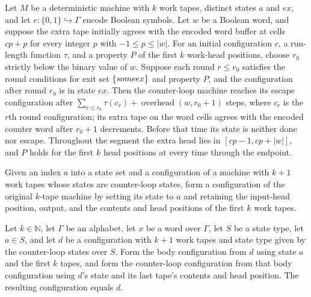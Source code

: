 \begin{theorem}
\label{Turing.counterLoopTMVia_escape_segment}
\leanok
{}
Let $M$ be a deterministic machine with $k$ work tapes, distinct states $a$ and $ex$,
and let $e:\{0,1\}\hookrightarrow\Gamma$ encode Boolean symbols. Let $w$ be a
Boolean word, and suppose the extra tape initially agrees with the encoded word buffer
at cells $cp+p$ for every integer $p$ with $-1\le p\le |w|$. For an initial
configuration $c$, a run-length function $\tau$, and a property $P$ of the first $k$
work-head positions, choose $r_0$ strictly below the binary value of $w$. Suppose each
round $r\le r_0$ satisfies the round conditions for exit set $\{some\\ ex\}$ and
property $P$, and the configuration after round $r_0$ is in state $ex$. Then the
counter-loop machine reaches its escape configuration after $\sum_{r\le
r_0}\tau(c_r)+\operatorname{overhead}(w,r_0+1)$ steps, where $c_r$ is the $r$th round
configuration; its extra tape on the word cells agrees with the encoded counter word
after $r_0+1$ decrements. Before that time its state is neither done nor escape.
Throughout the segment the extra head lies in $[cp-1,cp+|w|]$, and $P$ holds for the
first $k$ head positions at every time through the endpoint.
\end{theorem}

\begin{definition}
\label{Turing.counterLoopBody}
\leanok
{}
Given an index $a$ into a state set and a configuration of a machine with $k+1$ work
tapes whose states are counter-loop states, form a configuration of the original
$k$-tape machine by setting its state to $a$ and retaining the input-head position,
output, and the contents and head positions of the first $k$ work tapes.
\end{definition}

\begin{theorem}
\label{Turing.counterLoopCfg_body}
\leanok
{}
Let $k\in\mathbb{N}$, let $\Gamma$ be an alphabet, let $x$ be a word over $\Gamma$, let
$S$ be a state type, let $a\in S$, and let $d$ be a configuration with $k+1$ work tapes
and state type given by the counter-loop states over $S$. Form the body configuration
from $d$ using state $a$ and the first $k$ tapes, and form the counter-loop
configuration from that body configuration using $d$'s state and its last tape's
contents and head position. The resulting configuration equals $d$.
\end{theorem}


